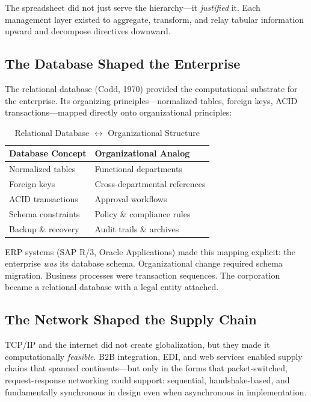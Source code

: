 \documentclass[11pt,a4paper,twocolumn]{article}
\begin{document}
The spreadsheet did not just serve the hierarchy---it \textit{justified} it. Each management layer existed to aggregate, transform, and relay tabular information upward and decompose directives downward.

\subsection{The Database Shaped the Enterprise}

The relational database (Codd, 1970) provided the computational substrate for the enterprise. Its organizing principles---normalized tables, foreign keys, ACID transactions---mapped directly onto organizational principles:

\begin{table}[H]
\centering
\small
\begin{tabular}{@{} >{\raggedright\arraybackslash}p{3.2cm} >{\raggedright\arraybackslash}p{4.2cm} @{}}
\toprule
\textbf{Database Concept} & \textbf{Organizational Analog} \\
\midrule
Normalized tables    & Functional departments \\[6pt]
Foreign keys         & Cross-departmental references \\[6pt]
ACID transactions    & Approval workflows \\[6pt]
Schema constraints   & Policy \& compliance rules \\[6pt]
Backup \& recovery   & Audit trails \& archives \\
\bottomrule
\end{tabular}
\caption{Relational Database $\leftrightarrow$ Organizational Structure}
\label{tab:db-org-mapping}
\end{table}

ERP systems (SAP R/3, Oracle Applications) made this mapping explicit: the enterprise \textit{was} its database schema. Organizational change required schema migration. Business processes were transaction sequences. The corporation became a relational database with a legal entity attached.

\subsection{The Network Shaped the Supply Chain}

TCP/IP and the internet did not create globalization, but they made it computationally \textit{feasible}. B2B integration, EDI, and web services enabled supply chains that spanned continents---but only in the forms that packet-switched, request-response networking could support: sequential, handshake-based, and fundamentally synchronous in design even when asynchronous in implementation.
\end{document}
